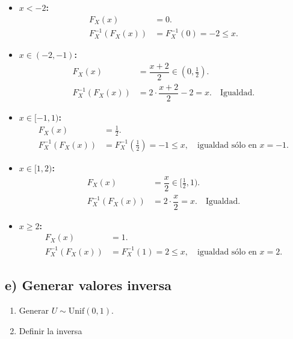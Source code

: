 \documentclass[10pt,a4paper]{article}
\begin{document}
    \begin{itemize}
\item
  \textbf{\(x<-2\):}\\
  \[
  \begin{align*}
  F_X(x) &= 0. \\
  F_X^{-1}(F_X(x)) &= F_X^{-1}(0) = -2 \leq x.
  \end{align*}
  \]
\item
  \textbf{\(x\in(-2,-1)\):}\\
  \[
  \begin{align*}
  F_X(x) &= \dfrac{x+2}{2} \in (0,\tfrac12). \\
  F_X^{-1}(F_X(x)) &= 2\cdot\dfrac{x+2}{2}-2 = x. \quad \text{Igualdad.}
  \end{align*}
  \]
\item
  \textbf{\(x\in[-1,1)\):}\\
  \[
  \begin{align*}
  F_X(x) &= \tfrac12. \\
  F_X^{-1}(F_X(x)) &= F_X^{-1}(\tfrac12) = -1 \leq x, \quad \text{igualdad sólo en } x=-1.
  \end{align*}
  \]
\item
  \textbf{\(x\in[1,2)\):}\\
  \[
  \begin{align*}
  F_X(x) &= \dfrac{x}{2} \in [\tfrac12,1). \\
  F_X^{-1}(F_X(x)) &= 2\cdot\dfrac{x}{2} = x. \quad \text{Igualdad.}
  \end{align*}
  \]
\item
  \textbf{\(x\geq 2\):}\\
  \[
  \begin{align*}
  F_X(x) &= 1. \\
  F_X^{-1}(F_X(x)) &= F_X^{-1}(1) = 2 \leq x, \quad \text{igualdad sólo en } x=2.
  \end{align*}
  \]
\end{itemize}

    \hypertarget{e-cuxf3mo-generar-valores-con-el-muxe9todo-de-la-funciuxf3n-inversa}{%
\subsection{e) Generar valores
inversa}\label{e-cuxf3mo-generar-valores-con-el-muxe9todo-de-la-funciuxf3n-inversa}}

    \begin{enumerate}
\def\labelenumi{\arabic{enumi}.}
\item
  Generar \(U\sim\mathrm{Unif}(0,1)\).
\item
  Definir la inversa
\end{enumerate}
\end{document}
